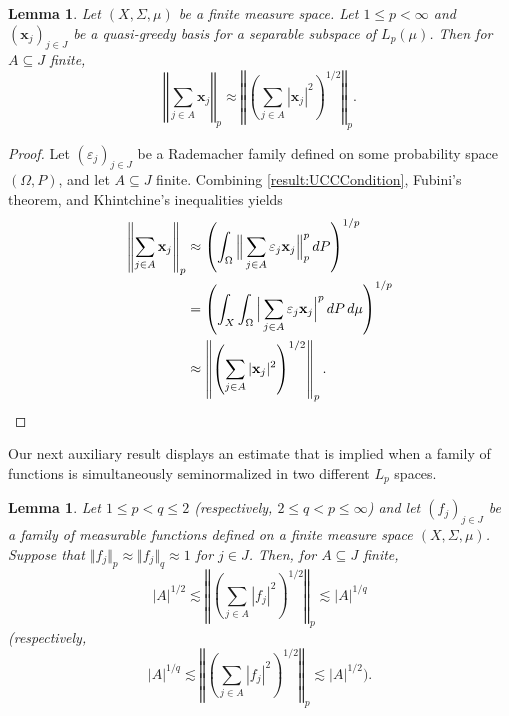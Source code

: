 \documentclass[11pt, leqno]{amsart}
\newtheorem{lemma}[theorem]{Lemma}
\theoremstyle{remark}
\numberwithin{equation}{section}
\newcommand{\xx}{\ensuremath{\mathbf{x}}}
\begin{document}
\begin{lemma}
\label{result:Random}
Let $(X,\Sigma,\mu)$ be a finite measure space. Let $1\le p<\infty$ and $(\xx_j)_{j\in J}$ be a quasi-greedy basis for
a separable subspace of $L_p(\mu)$. Then for $A\subseteq J$ finite,
\[
\left\Vert \sum_{j\in A}\xx_j \right\Vert_p
\approx \left\Vert \left(\sum_{j\in A} |\xx_j|^2\right)^{1/2}\right\Vert_p.
\]
\end{lemma}

\begin{proof}
Let $(\varepsilon_j)_{j\in J}$ be a Rademacher family defined on some probability space $(\Omega,P)$, and let $A\subseteq J$ finite. Combining \eqref{result:UCCCondition}, Fubini's
theorem, and Khintchine's inequalities yields 
\begin{align*}
\left\Vert \sum_{j\in A}\xx_j \right\Vert_p
&\approx \left( \int_\Omega \Big\Vert \sum_{j\in A}\varepsilon_j \xx_j \Big\Vert_p^p\, dP\right)^{1/p}\\
&= \left(\int_X \int_\Omega \Big| \sum_{j\in A} \varepsilon_j \xx_j\Big|^p \, dP \,d\mu\right)^{1/p}\\
&\approx \left\Vert \left(\sum_{j\in A} |\xx_j|^2\right)^{1/2}\right\Vert_p.
\qedhere
\end{align*}
\end{proof}


Our next auxiliary result displays an estimate that is implied when a family of functions is simultaneously seminormalized in two different $L_{p}$ spaces.

\begin{lemma}
\label{result:PreviousDemocracyEstimates} 
Let $1\le p< q\le 2$ (respectively, $2\le q <p\le\infty$) and let $(f_j)_{j\in J}$ be a family of measurable functions defined on a finite measure space $(X,\Sigma,\mu)$. Suppose that
$\Vert f_j\Vert_p\approx \Vert f_j \Vert_q\approx 1$ for $j\in J$. Then, for $A\subseteq J$ finite,
\[
|A|^{1/2} \lesssim \left\Vert \left( \sum_{j\in A}| f_j|^2\right)^{1/2}\right\Vert_p \lesssim |A|^{1/q}
\]
(respectively,
\[
|A|^{1/q} \lesssim \left\Vert \left( \sum_{j\in A}| f_j|^2\right)^{1/2}\right\Vert_p \lesssim |A|^{1/2}).
\]
\end{lemma}
\end{document}
